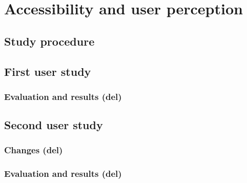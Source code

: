 
\chapter{Accessibility and user perception}\label{chapter:userstudy}

\section{Study procedure}

\section{First user study}
\subsection{Evaluation and results (del)}

\section{Second user study}
\subsection{Changes (del)}
\subsection{Evaluation and results (del)}